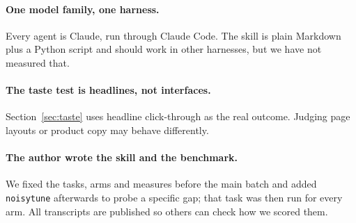 \paragraph{One model family, one harness.} Every agent is Claude, run through Claude Code. The skill is plain
Markdown plus a Python script and should work in other harnesses, but we have not measured that.

\paragraph{The taste test is headlines, not interfaces.} Section~\ref{sec:taste} uses headline click-through as
the real outcome. Judging page layouts or product copy may behave differently.

\paragraph{The author wrote the skill and the benchmark.} We fixed the tasks, arms and measures before the main
batch and added \texttt{noisytune} afterwards to probe a specific gap; that task was then run for every arm. All
transcripts are published so others can check how we scored them.
